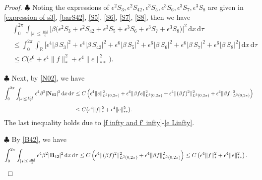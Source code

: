 \documentclass[10pt, reqno]{amsart}
\numberwithin{equation}{section}
\theoremstyle{definition}
\begin{document}
{{\begin{proof}
\smallskip\noindent$\clubsuit$
 Noting the expressions of $\epsilon^2 S_{3}, \epsilon^2 S_{42}, \epsilon^3 S_{5}, \epsilon^3 S_{6}, \epsilon^3 S_{7}, \epsilon^3 S_{8} $ are given in \eqref{expression of s3}, \eqref{barS42}, \eqref{S5}, \eqref{S6}, \eqref{S7}, \eqref{S8}, then we have
\begin{align} \label{estimate in mathcal S-L2-1}
 & \int_0^{2\pi} \int_{|s| \le \frac{10\delta} \epsilon} \Big|\beta \big(\epsilon^2 S_{3} + \epsilon^2 S_{42} + \epsilon^3 S_{5} +\epsilon^3 S_{6}
 +\epsilon^3 S_{7} +\epsilon^3 S_{8} \big)\Big|^2 \,{\mathrm d}x \,{\mathrm d}\tau
\nonumber\\[2mm]
& \le \int_0^{2\pi} \int_{{\mathbb R}} \Big[ \epsilon^4 |\beta\, S_{3}|^2 + \epsilon^4 |\beta\, S_{42}|^2 + \epsilon^6 |\beta\, S_{5}|^2 + \epsilon^6 |\beta\, S_{6}|^2 + \epsilon^6 |\beta\, S_{7}|^2 + \epsilon^6 |\beta\, S_{8}|^2 \Big] \,{\mathrm d}x \,{\mathrm d}\tau
\nonumber\\[2mm]
& \le C \big(\epsilon^6+ \epsilon^4 \|f\|_*^2+ \epsilon^4\|e\|_{**}^2 \big).
\end{align}




\smallskip\noindent$\clubsuit$
Next, by \eqref{N02}, we have
\begin{align} \label{estimate in mathcal S-L2-2}
 \int_0^{2\pi} \int_{|s| \le \frac{10\delta} \epsilon} \epsilon^4\beta^2| {\bf N}_{02}|^2 \,{\mathrm d}x \,{\mathrm d}\tau
& \le C\left( \epsilon^4 \|e\|^2_{L^2(0, 2\pi)} + \epsilon^4 \|\beta fe\|^2_{L^2(0, 2\pi)} + \epsilon^4 \|(\beta f)^2\|^2_{L^2(0, 2\pi)} + \epsilon^4 \|\beta f\|^2_{L^2(0, 2\pi)} \right)
\nonumber\\[2mm]
& \le C \big(\epsilon^4 \|f\|_*^2+ \epsilon^4\|e\|_{**}^2 \big).
\end{align}
The last inequality holds due to \eqref{f infty and f' infty}-\eqref{e Linfty}.

\smallskip\noindent$\clubsuit$
By \eqref{B42}, we have
\begin{align} \label{estimate in mathcal S-L2-3}
 \int_0^{2\pi} \int_{|s| \le \frac{10\delta} \epsilon} \epsilon^4\beta^2|{\bf B}_{42}|^2 \,{\mathrm d}x \,{\mathrm d}\tau
& \le C\left( \epsilon^4 \|(\beta f)^2\|^2_{L^2(0, 2\pi)} + \epsilon^4 \|\beta  f\|^2_{L^2(0, 2\pi)} \right)
 \le C \left( \epsilon^4 \|f\|_*^2+ \epsilon^4\|e\|_{**}^2 \right).
\end{align}


\end{proof}}}
\end{document}
